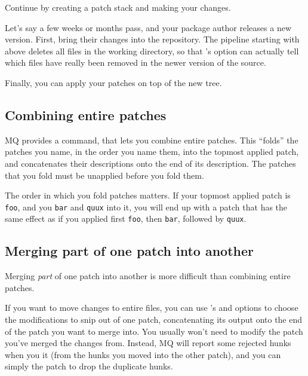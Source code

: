 Continue by creating a patch stack and making your changes.

Let's say a few weeks or months pass, and your package author releases
a new version.  First, bring their changes into the repository.
The pipeline starting with  above deletes all files in
the working directory, so that 's
 option can actually tell which files have
really been removed in the newer version of the source.

Finally, you can apply your patches on top of the new tree.

\subsection{Combining entire patches}
\label{sec:mq:combine}

MQ provides a command,  that lets you combine entire
patches.  This ``folds'' the patches you name, in the order you name
them, into the topmost applied patch, and concatenates their
descriptions onto the end of its description.  The patches that you
fold must be unapplied before you fold them.

The order in which you fold patches matters.  If your topmost applied
patch is \texttt{foo}, and you  \texttt{bar} and
\texttt{quux} into it, you will end up with a patch that has the same
effect as if you applied first \texttt{foo}, then \texttt{bar},
followed by \texttt{quux}.

\subsection{Merging part of one patch into another}

Merging \emph{part} of one patch into another is more difficult than
combining entire patches.

If you want to move changes to entire files, you can use
's  and
 options to choose the modifications to snip
out of one patch, concatenating its output onto the end of the patch
you want to merge into.  You usually won't need to modify the patch
you've merged the changes from.  Instead, MQ will report some rejected
hunks when you  it (from the hunks you moved into the
other patch), and you can simply  the patch to drop
the duplicate hunks.

